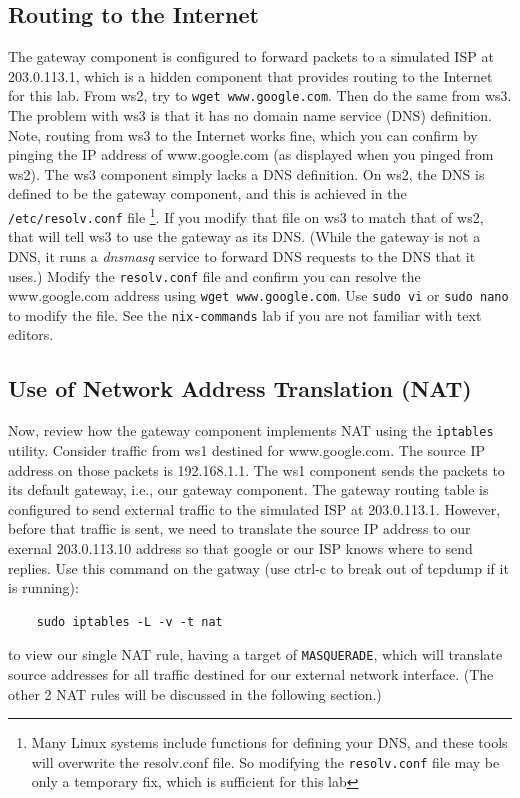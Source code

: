 \subsection{Routing to the Internet}
The gateway component is configured to forward packets to a simulated ISP at 203.0.113.1, which 
is a hidden component that provides routing to the Internet for this lab.  From ws2, 
try to {\tt wget www.google.com}.  Then do the same from ws3.  The problem with ws3 is that
it has no domain name service (DNS) definition.  Note, routing from ws3 to the Internet
works fine, which you can confirm by pinging the IP address of www.google.com (as displayed
when you pinged from ws2).  The ws3 component simply lacks a DNS definition. 
On ws2, the DNS is defined to be the
gateway component, and this is achieved in the \texttt{/etc/resolv.conf} file \footnote{
Many Linux systems include functions for defining your DNS, and these tools will overwrite
the resolv.conf file.  So modifying the {\tt resolv.conf} file may be only a temporary
fix, which is sufficient for this lab}.  If you 
modify that file on ws3 to match that of ws2, that will tell ws3 to use the gateway
as its DNS.  (While the gateway is not a DNS, it runs a \textit{dnsmasq} service to forward DNS requests to
the DNS that it uses.)   Modify the {\tt resolv.conf} file and confirm you can resolve the www.google.com
address using {\tt wget www.google.com}.  Use {\tt sudo vi} or {\tt sudo nano} to modify the file.  See the 
{\tt nix-commands} lab if you are not familiar with text editors.

\subsection{Use of Network Address Translation (NAT)}
Now, review how the gateway component implements NAT using the \texttt{iptables} 
utility.  Consider traffic from ws1 destined for www.google.com. The source IP address
on those packets is 192.168.1.1.  The ws1 component sends the packets to its default
gateway, i.e., our gateway component.  The gateway routing table is configured to
send external traffic to the simulated ISP at 203.0.113.1.  However, before that traffic is sent, we need
to translate the source IP address to our exernal 203.0.113.10 address so that google or our ISP knows
where to send replies.  
Use this command on the gatway (use ctrl-c to break out of tcpdump if it is running):
\begin{verbatim}
    sudo iptables -L -v -t nat
\end{verbatim}
\noindent to view our single NAT rule, having a target of \texttt{MASQUERADE}, which will translate
source addresses for all traffic destined for our external network interface. (The other 2 NAT rules will
be discussed in the following section.) 

